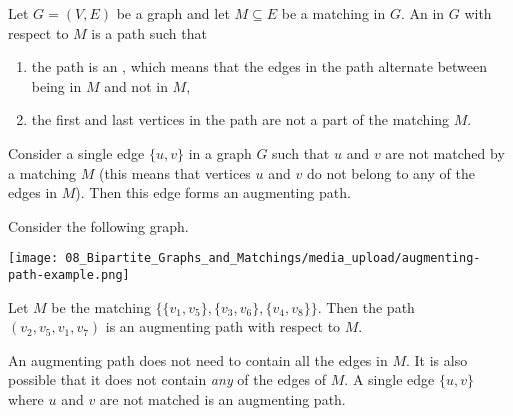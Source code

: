 \begin{flex}
\label{grp:definition:Augmenting-path}

\begin{definition}
\label{definition:Augmenting-path}
Let $G = (V,E)$ be a graph and let $M \subseteq E$ be a matching in $G$. An  in $G$ with respect to $M$ is a path such that
\begin{enumerate}
   \item the path is an , which means that the edges in the path alternate between being in $M$ and not in $M$,
   \item the first and last vertices in the path are not a part of the matching $M$.
\end{enumerate}

\end{definition}

\begin{example}
\label{xmpl:matchings-in-graphs::augmenting-path-example-1}
Consider a single edge $\{u,v\}$ in a graph $G$ such that $u$ and $v$ are not matched by a matching $M$ (this means that vertices $u$ and $v$ do not belong to any of the edges in $M$). Then this edge forms an augmenting path.

\end{example}

\begin{example}
\label{example:Augmenting-path-example}
Consider the following graph.
\begin{center}
    \texttt{[image: 08\_Bipartite\_Graphs\_and\_Matchings/media\_upload/augmenting-path-example.png]}
\end{center}
Let $M$ be the matching $\{\{v_1,v_5\}, \{v_3,v_6\}, \{v_4,v_8\}\}$. Then the path $(v_2,v_5,v_1,v_7)$ is an augmenting path with respect to $M$.

\end{example}
\end{flex}

\begin{note}
\label{note:Edge-cases-for-augmenting-paths}
An augmenting path does not need to contain all the edges in $M$. It is also possible that it does not contain \emph{any} of the edges of $M$. A single edge $\{u, v\}$ where $u$ and $v$ are not matched is an augmenting path.

\end{note}

